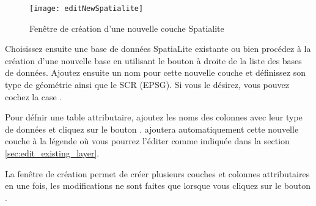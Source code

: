 \begin{figure}[ht]
   \centering
   \texttt{[image: editNewSpatialite]}
   \caption{Fenêtre de création d'une nouvelle couche Spatialite \nixcaption}\label{fig:newspatialitelayer}
\end{figure}


Choisissez ensuite une base de données SpatiaLite existante ou bien procédez à la création d'une nouvelle base en utilisant le bouton  à droite de la liste des bases de données. Ajoutez ensuite un nom pour cette nouvelle couche et définissez son type de géométrie ainsi que le SCR (EPSG). Si vous le désirez, vous pouvez cochez la case .


Pour défnir une table attributaire, ajoutez les noms des colonnes avec leur type de données et cliquez sur le bouton . \qg ajoutera automatiquement cette nouvelle couche à la légende où vous pourrez l'éditer comme indiquée dans la section \ref{sec:edit_existing_layer}.

La fenêtre de création permet de créer plusieurs couches et colonnes attributaires en une fois, les modifications ne sont faites que lorsque vous cliquez sur le bouton .

